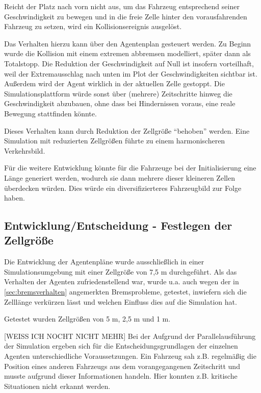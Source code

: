 Reicht der Platz nach vorn nicht aus, um das Fahrzeug entsprechend seiner Geschwindigkeit zu bewegen und in die freie Zelle hinter den vorausfahrenden Fahrzeug zu setzen, wird ein Kollisionsereignis ausgelöst.

Das Verhalten hierzu kann über den Agentenplan gesteuert werden.
Zu Beginn wurde die Kollision mit einem extremen abbremsen modelliert, später dann als Totalstopp.
Die Reduktion der Geschwindigkeit auf Null ist insofern vorteilhaft, weil der Extremausschlag nach unten im Plot der Geschwindigkeiten sichtbar ist.
Außerdem wird der Agent wirklich in der aktuellen Zelle gestoppt. 
Die Simulationsplattform würde sonst über (mehrere) Zeitschritte hinweg die Geschwindigkeit abzubauen, ohne dass bei Hindernissen voraus, eine reale Bewegung stattfinden könnte. 

Dieses Verhalten kann durch Reduktion der Zellgröße \enquote{behoben} werden.
Eine Simulation mit reduzierten Zellgrößen führte zu einem harmonischeren Verkehrsbild.

Für die weitere Entwicklung könnte für die Fahrzeuge bei der Initialisierung eine Länge generiert werden, wodurch sie dann mehrere dieser kleineren Zellen überdecken würden.
Dies würde ein diversifizierteres Fahrzeugbild zur Folge haben.



\subsection{Entwicklung/Entscheidung - Festlegen der Zellgröße}

Die Entwicklung der Agentenpläne wurde ausschließlich in einer Simulationsumgebung mit einer Zellgröße von 7,5 m durchgeführt.
Als das Verhalten der Agenten zufriedenstellend war, wurde u.a. auch wegen der in \cref{sec:bremsverhalten} angemerkten Bremsprobleme, getestet, inwiefern sich die Zelllänge verkürzen lässt und welchen Einfluss dies auf die Simulation hat.

Getestet wurden Zellgrößen von 5 m, 2,5 m und 1 m.

[WEISS ICH NOCHT NICHT MEHR]
Bei der Aufgrund der Parallelausführung der Simulation ergeben sich für die Entscheidungsgrundlagen der einzelnen Agenten unterschiedliche Voraussetzungen.
Ein Fahrzeug sah z.B. regelmäßig die Position eines anderen Fahrzeugs aus dem vorangegangenen Zeitschritt und musste aufgrund dieser Informationen handeln.
Hier konnten z.B. kritische Situationen nicht erkannt werden.



